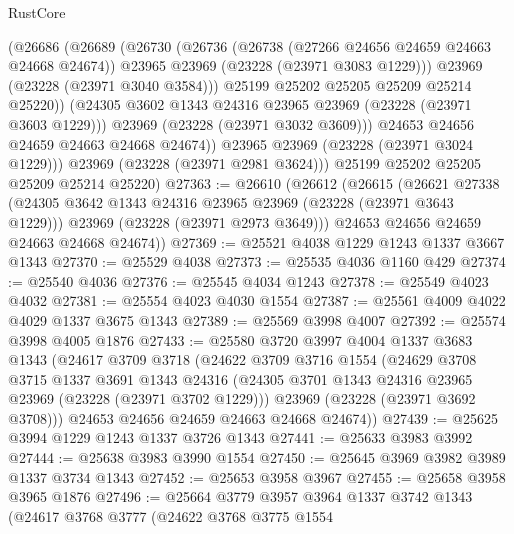 \begin{lexlean}{RustCore}
\begin{coremodule}
                (@26686
                  (@26689
                    (@26730
                      (@26736
                        (@26738 (@27266 @24656 @24659 @24663 @24668 @24674))
                        @23965
                        @23969
                        (@23228 (@23971 @3083 @1229)))
                      @23969
                      (@23228 (@23971 @3040 @3584)))
                    @25199
                    @25202
                    @25205
                    @25209
                    @25214
                    @25220))
                (@24305 @3602 @1343 @24316 @23965 @23969 (@23228 (@23971 @3603 @1229)))
                @23969
                (@23228 (@23971 @3032 @3609)))
              @24653
              @24656
              @24659
              @24663
              @24668
              @24674))
          @23965
          @23969
          (@23228 (@23971 @3024 @1229)))
        @23969
        (@23228 (@23971 @2981 @3624)))
      @25199
      @25202
      @25205
      @25209
      @25214
      @25220)
@27363 := @26610
    (@26612
      (@26615
        (@26621
          @27338
          (@24305 @3642 @1343 @24316 @23965 @23969 (@23228 (@23971 @3643 @1229)))
          @23969
          (@23228 (@23971 @2973 @3649)))
        @24653
        @24656
        @24659
        @24663
        @24668
        @24674))
@27369 := @25521 @4038 @1229 @1243 @1337 @3667 @1343
@27370 := @25529 @4038
@27373 := @25535 @4036 @1160 @429
@27374 := @25540 @4036
@27376 := @25545 @4034 @1243
@27378 := @25549 @4023 @4032
@27381 := @25554 @4023 @4030 @1554
@27387 := @25561 @4009 @4022 @4029 @1337 @3675 @1343
@27389 := @25569 @3998 @4007
@27392 := @25574 @3998 @4005 @1876
@27433 := @25580
    @3720
    @3997
    @4004
    @1337
    @3683
    @1343
    (@24617
      @3709
      @3718
      (@24622
        @3709
        @3716
        @1554
        (@24629
          @3708
          @3715
          @1337
          @3691
          @1343
          @24316
          (@24305 @3701 @1343 @24316 @23965 @23969 (@23228 (@23971 @3702 @1229)))
          @23969
          (@23228 (@23971 @3692 @3708)))
        @24653
        @24656
        @24659
        @24663
        @24668
        @24674))
@27439 := @25625 @3994 @1229 @1243 @1337 @3726 @1343
@27441 := @25633 @3983 @3992
@27444 := @25638 @3983 @3990 @1554
@27450 := @25645 @3969 @3982 @3989 @1337 @3734 @1343
@27452 := @25653 @3958 @3967
@27455 := @25658 @3958 @3965 @1876
@27496 := @25664
    @3779
    @3957
    @3964
    @1337
    @3742
    @1343
    (@24617
      @3768
      @3777
      (@24622
        @3768
        @3775
        @1554

\end{coremodule}
\end{lexlean}
